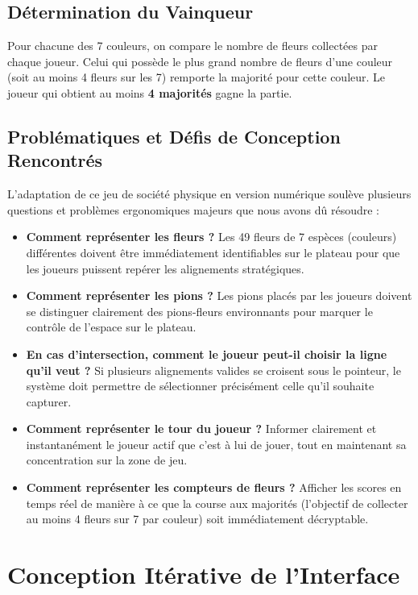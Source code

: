 \documentclass[11pt,a4paper]{article}
\begin{document}
\subsection{Détermination du Vainqueur}
Pour chacune des 7 couleurs, on compare le nombre de fleurs collectées par chaque joueur. Celui qui possède le plus grand nombre de fleurs d'une couleur (soit au moins 4 fleurs sur les 7) remporte la majorité pour cette couleur. Le joueur qui obtient au moins \textbf{4 majorités} gagne la partie.

\subsection{Problématiques et Défis de Conception Rencontrés}
L'adaptation de ce jeu de société physique en version numérique soulève plusieurs questions et problèmes ergonomiques majeurs que nous avons dû résoudre :
\begin{itemize}
    \item \textbf{Comment représenter les fleurs ?} Les 49 fleurs de 7 espèces (couleurs) différentes doivent être immédiatement identifiables sur le plateau pour que les joueurs puissent repérer les alignements stratégiques.
    \item \textbf{Comment représenter les pions ?} Les pions placés par les joueurs doivent se distinguer clairement des pions-fleurs environnants pour marquer le contrôle de l'espace sur le plateau.
\item \textbf{En cas d'intersection, comment le joueur peut-il choisir la ligne qu'il veut ?} Si plusieurs alignements valides se croisent sous le pointeur, le système doit permettre de sélectionner précisément celle qu'il souhaite capturer.
    \item \textbf{Comment représenter le tour du joueur ?} Informer clairement et instantanément le joueur actif que c'est à lui de jouer, tout en maintenant sa concentration sur la zone de jeu.
    \item \textbf{Comment représenter les compteurs de fleurs ?} Afficher les scores en temps réel de manière à ce que la course aux majorités (l'objectif de collecter au moins 4 fleurs sur 7 par couleur) soit immédiatement décryptable.
\end{itemize}

\newpage

\section{Conception Itérative de l'Interface}
\end{document}
